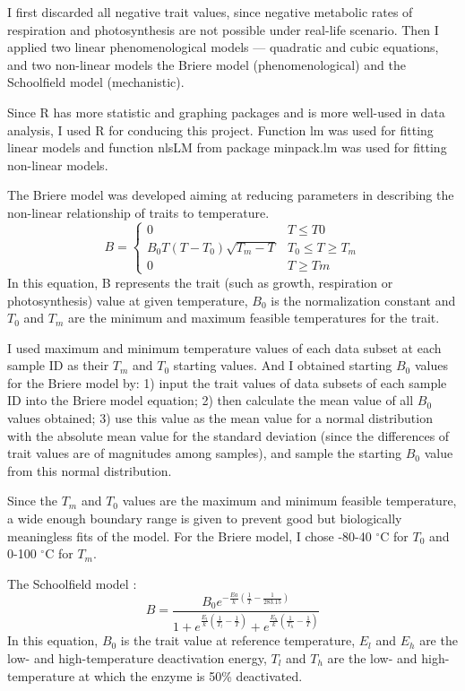 \documentclass[11pt, a4paper]{article}
\begin{document}
\begin{spacing}{1.5}
I first discarded all negative trait values, since negative metabolic rates of respiration and photosynthesis are not possible under real-life scenario. Then I applied two linear phenomenological models --- quadratic and cubic equations, and two non-linear models the Briere model (phenomenological) and the Schoolfield model (mechanistic). 

Since R has more statistic and graphing packages and is more well-used in data analysis, I used R for conducing this project. Function lm was used for fitting linear models and function nlsLM from package minpack.lm \citep{elzhov2016package} was used for fitting non-linear models. 

The Briere model \citep{briere1999novel} was developed aiming at reducing parameters in describing the non-linear relationship of traits to temperature. \begin{equation}
    B = \left\{
    \begin{array}{cc}
        0 & T \leq T0 \\
        B_0T(T - T_0)\sqrt{T_m - T} & T_0 \leq T \geq T_m \\
        0 & T \geq Tm
    \end{array}\right.
\end{equation}
In this equation, B represents the trait (such as growth, respiration or photosynthesis) value at given temperature, $B_0$ is the normalization constant and $T_0$ and $T_m$ are the minimum and maximum feasible temperatures for the trait.

I used maximum and minimum temperature values of each data subset at each sample ID as their $T_m$ and $T_0$ starting values. And I obtained starting $B_0$ values for the Briere model by: 1) input the trait values of data subsets of each sample ID into the Briere model equation; 2) then calculate the mean value of all $B_0$ values obtained; 3) use this value as the mean value for a normal distribution with the absolute mean value for the standard deviation (since the differences of trait values are of magnitudes among samples), and sample the starting $B_0$ value from this normal distribution. 

Since the $T_m$ and $T_0$ values are the maximum and minimum feasible temperature, a wide enough boundary range is given to prevent good but biologically meaningless fits of the model. For the Briere model, I chose -80-40 $^{\circ}$C for $T_0$ and 0-100 $^{\circ}$C for $T_m$. 

The Schoolfield model \citep{schoolfield1981non}:  
\begin{equation}
    B = \frac{B_0e^{-\frac{Ea}{k}(\frac{1}{T} - \frac{1}{283.15})}}{1+e^{\frac{E_l}{k}(\frac{1}{T_l} - \frac{1}{T})}+e^{\frac{E_h}{k}(\frac{1}{T_h} - \frac{1}{T})}}
\end{equation}
In this equation, $B_0$ is the trait value at reference temperature, $E_l$ and $E_h$ are the low- and high-temperature deactivation energy, $T_l$ and $T_h$ are the low- and high- temperature at which the enzyme is 50\% deactivated. 


\end{spacing}
\end{document}
